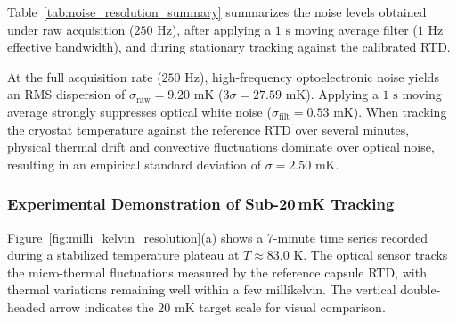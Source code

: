 \documentclass[12pt]{article}
\begin{document}
Table~\ref{tab:noise_resolution_summary} summarizes the noise levels obtained under raw acquisition ($250\text{ Hz}$), after applying a $1\text{ s}$ moving average filter ($1\text{ Hz}$ effective bandwidth), and during stationary tracking against the calibrated RTD.

\begin{table}[htpb]
    \centering
    \small
    \caption{Noise floor and thermal resolution limits for PEEK-4 fiber at $T \approx 83.0\text{ K}$.}
    \label{tab:noise_resolution_summary}
\end{table}

At the full acquisition rate ($250\text{ Hz}$), high-frequency optoelectronic noise yields an RMS dispersion of $\sigma_{\mathrm{raw}} = 9.20\text{ mK}$ ($3\sigma = 27.59\text{ mK}$). Applying a $1\text{ s}$ moving average strongly suppresses optical white noise ($\sigma_{\mathrm{filt}} = 0.53\text{ mK}$). When tracking the cryostat temperature against the reference RTD over several minutes, physical thermal drift and convective fluctuations dominate over optical noise, resulting in an empirical standard deviation of $\sigma = 2.50\text{ mK}$.

\subsubsection{Experimental Demonstration of Sub-20\,mK Tracking}

Figure~\ref{fig:milli_kelvin_resolution}(a) shows a 7-minute time series recorded during a stabilized temperature plateau at $T \approx 83.0\text{ K}$. The optical sensor tracks the micro-thermal fluctuations measured by the reference capsule RTD, with thermal variations remaining well within a few millikelvin. The vertical double-headed arrow indicates the $20\text{ mK}$ target scale for visual comparison.
\end{document}
